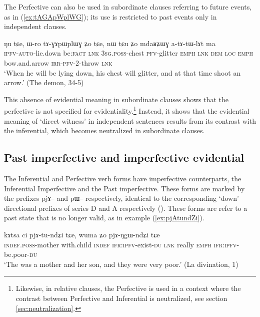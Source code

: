 \documentclass[oldfontcommands,oneside,a4paper,11pt]{article}
\newcommand{\ipa}[1]{{\phon \mbox{#1}}} %
\newcommand{\refb}[1]{(\ref{#1})}
\newcommand{\factual}[1]{\textsc{:fact}}
\begin{document}
The Perfective can also be used in subordinate clauses referring to future events, as in \refb{ex:tAGApWplWG}; its use is restricted to past events only in independent clauses.

\begin{exe}
\ex \label{ex:tAGApWplWG}
\gll \ipa{ku-nɯ-rŋgɯ} 	\ipa{ŋu} 	\ipa{tɕe,} 	\ipa{ɯ-ro} 	\ipa{tɤ-ɣɤpɯplɯɣ} 	\ipa{ʑo} 	\ipa{tɕe,} 	\ipa{nɯ} 	\ipa{tɕu} 	\ipa{ʑo} 	\ipa{mdaʁʑɯɣ} 	\ipa{a-tɤ-tɯ-lɤt} 	\ipa{ma}  \\
\textsc{ipfv-auto}-lie.down be\factual{} \textsc{lnk} \textsc{3sg.poss}-chest \textsc{pfv}-glitter \textsc{emph} \textsc{lnk} \textsc{dem} \textsc{loc} \textsc{emph} bow.and.arrow \textsc{irr-pfv}-2-throw \textsc{lnk} \\
\glt `When he will be lying down, his chest will glitter, and at that time shoot an arrow.' (The demon, 34-5)
\end{exe}


This absence of evidential meaning in subordinate clauses shows that the perfective is not specified for evidentiality.\footnote{Likewise, in relative clauses, the Perfective is used in a context where the contrast between Perfective and Inferential is neutralized, see section \ref{sec:neutralization}.} Instead, it shows that the evidential meaning of `direct witness' in independent sentences results from its contrast with the inferential, which becomes neutralized in subordinate clauses.


\subsection{Past imperfective and imperfective evidential}  \label{sec:pst:ipfv}
The Inferential and Perfective verb forms have imperfective counterparts, the Inferential Imperfective and the  Past imperfective. These forms are marked by the prefixes \ipa{pjɤ--} and \ipa{pɯ--} respectively, identical to the 
corresponding `down' directional prefixes of series D and A respectively (\citealt{lin11direction}). These forms are refer to a past state that is no longer valid, as in example \refb{ex:pjAtundZi}. 

\begin{exe}
\ex \label{ex:pjAtundZi}
\gll  \ipa{tɤ-mu} 	\ipa{kɤtsa} 	\ipa{ci} 	\ipa{pjɤ-tu-ndʑi} 	\ipa{tɕe,} 	\ipa{wuma} 	\ipa{ʑo} 	\ipa{pjɤ-ŋgɯ-ndʑi} 	\ipa{tɕe}  \\
\textsc{indef.poss}-mother with.child \textsc{indef} \textsc{ifr:ipfv}-exist-\textsc{du} \textsc{lnk} really \textsc{emph}  \textsc{ifr:ipfv}-be.poor-\textsc{du} \\
\glt `The was a mother and her son, and they were very poor.' (La divination, 1)
\end{exe}
\end{document}
